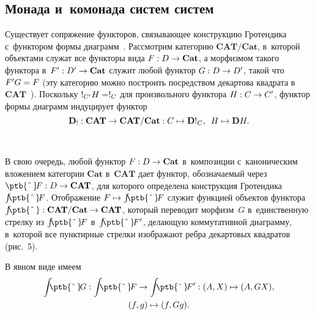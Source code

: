 \begin{multicols}{2}
\section{Монада и~комонада систем систем}

     Существует сопряжение функторов, свя\-зы\-ва\-ющее конструкцию 
Гротендика с~функтором формы диаграмм~\cite{6-kov}. Рассмотрим категорию 
$\mathbf{CAT}/\mathbf{Cat}$, в~которой объектами служат все функторы вида 
$F : D \hm \to \mathbf{Cat}$, а морфизмом такого функтора в~$F^\prime 
 : D^\prime \hm\to \mathbf{Cat}$ служит любой функтор $G : D \hm\to D^\prime$, 
такой что $F^\prime G \hm= F$ (эту категорию можно построить посредством 
декартова квадрата в~$\mathbf{CAT}$~\cite{13-kov}). Поскольку $!_{C^\prime}H 
\hm= !_C$ для произвольного функтора $H : C \hm\to C^\prime$, функтор формы 
диаграмм индуцирует функтор
     $$
\mathbf{D}_! : \mathbf{CAT}\to \mathbf{CAT}/\mathbf{Cat} : 
C \mapsto \mathbf{D}!_C,\enskip  H \mapsto \mathbf{D}H.
$$

\setcounter{figure}{5}
\begin{figure*}[b] %
\vspace*{1pt}
 \begin{center}
   \mbox{%
\epsfxsize=103.315mm 
}

\end{center}
\vspace*{-9pt}
\end{figure*}
     

     В свою очередь, любой функтор $F : D \hm\to \mathbf{Cat}$ в~композиции с~каноническим вложением категории $\mathbf{Cat}$ в~$\mathbf{CAT}$ дает 
функтор, обозначаемый через ${\mbox{\ptb{\^{\,}}}}\!F : D \hm\to 
\mathbf{CAT}$, для которого определена конструкция Гротендика $\int 
{\mbox{\!\!\!\ptb{\^{\,}}}}\!F$. Отображение $F \hm\mapsto 
\int{\mbox{\!\!\!\ptb{\^{\,}}}}\!F$ служит функцией объектов функтора $\int 
{\mbox{\!\!\!\ptb{\^{\,}}}} : \mathbf{CAT}/\mathbf{Cat}\hm\to  
\mathbf{CAT}$, который переводит морфизм~$G$ в~единственную стрелку из 
$\int {\mbox{\!\!\!\ptb{\^{\,}}}} \!F$ в~$\int {\mbox{\!\!\!\ptb{\^{\,}}}} \!F^\prime$, делающую коммутативной диаграмму, в~которой 
все пунктирные стрелки изображают ребра декартовых квадратов (рис.~5).



     В явном виде имеем 
\begin{multline*}
     \int {\mbox{\!\!\!\ptb{\^{\,}}}}\! G : \int{\mbox{\!\!\!\ptb{\^{\,}}}}\!F \to 
\int {\mbox{\!\!\!\ptb{\^{\,}}}} \!F^\prime : (A, X) \mapsto (A, GX),\\
 (f, g) \mapsto  (f, Gg).
   \end{multline*}
   

\end{multicols}
